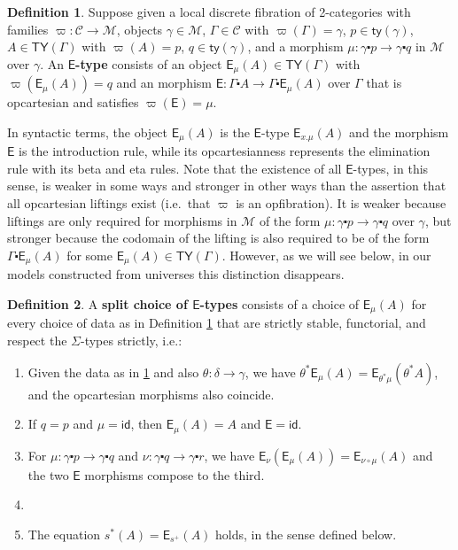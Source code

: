\documentclass[10pt]{article}
\theoremstyle{definition}
\newtheorem{definition}{Definition}
\newcommand{\id}{\mathsf{id}}
\newcommand\Esym{\ensuremath{\mathsf{E}}}
\newcommand\E[2]{\ensuremath{\mathsf{E}_{#1}(#2)}}
\newcommand\St[2]{\ensuremath{{#1}^*(#2)}}
\newcommand\TrPlusSym[1]{\ensuremath{{#1}^+}}
\newcommand\M{\mathcal{M}}
\newcommand\Mty{\mathsf{ty}}
\newcommand\C{\mathcal{C}}
\newcommand\Cty{\mathsf{TY}}
\newcommand\vp{\varpi}
\newcommand\ce{\mathord{\centerdot}}
\begin{document}
\begin{definition}\label{defn:E-sem}
  Suppose given a local discrete fibration of 2-categories with families $\vp:\C\to\M$, objects $\gamma\in\M$, $\Gamma\in \C$ with $\vp(\Gamma)=\gamma$, $p\in \Mty(\gamma)$, $A\in\Cty(\Gamma)$ with $\vp(A)=p$, $q\in \Mty(\gamma)$, and a morphism $\mu : \gamma \ce p \to \gamma\ce q$ in $\M$ over $\gamma$.
  An \textbf{$\Esym$-type} consists of an object $\E{\mu}{A} \in \Cty(\Gamma)$ with $\vp(\E{\mu}{A}) = q$ and an morphism $\Esym:\Gamma\ce A \to \Gamma\ce \E\mu A$ over $\Gamma$ that is opcartesian and satisfies $\vp(\Esym)=\mu$.
\end{definition}

In syntactic terms, the object $\E\mu A$ is the $\Esym$-type $\E{x.\mu}A$ and the morphism $\Esym$ is the introduction rule, while its opcartesianness represents the elimination rule with its beta and eta rules.
Note that the existence of all $\Esym$-types, in this sense, is weaker in some ways and stronger in other ways than the assertion that all opcartesian liftings exist (i.e.\ that $\vp$ is an opfibration).
It is weaker because liftings are only required for morphisms in $\M$ of the form $\mu : \gamma \ce p \to \gamma\ce q$ over $\gamma$, but stronger because the codomain of the lifting is also required to be of the form $\Gamma\ce \E\mu A$ for some $\E\mu A \in \Cty(\Gamma)$.
However, as we will see below, in our models constructed from universes this distinction disappears.

\begin{definition}
  A \textbf{split choice of $\Esym$-types} consists of a choice of $\E\mu A$ for every choice of data as in Definition \ref{defn:E-sem} that are strictly stable, functorial, and respect the $\Sigma$-types strictly, i.e.:
  \begin{enumerate}
  \item Given the data as in \ref{defn:E-sem} and also $\theta : \delta \to \gamma$, we have $\theta^*\E\mu A = \E{\theta^*\mu}{\theta^*A}$, and the opcartesian morphisms also coincide.
  \item If $q=p$ and $\mu=\id$, then $\E\mu A = A$ and $\Esym=\id$.
  \item For $\mu:\gamma\ce p \to \gamma\ce q$ and $\nu : \gamma\ce q \to \gamma\ce r$, we have $\E\nu{\E\mu A} = \E{\nu\circ \mu}{A}$ and the two $\Esym$ morphisms compose to the third.
  \item {}
  \item The equation $\St{s}{A}=\E{\TrPlusSym{s}}{A}$ holds, in the sense defined below.
  \end{enumerate}
\end{definition}
\end{document}
